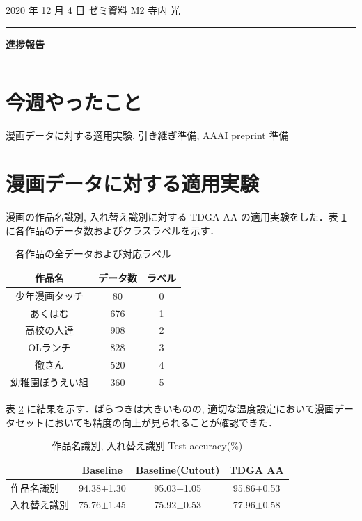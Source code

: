 \documentclass[onecolumn]{ujarticle}   %
\begin{document}
	\noindent

	\hspace{1em}
	2020 年 12 月 4 日
	ゼミ資料
	\hfill
	M2 寺内 光

	\vspace{2mm}

	\hrule

	\begin{center}
		{\Large \bf 進捗報告}
	\end{center}

	\hrule
	\vspace{3mm}

	\section{今週やったこと}
	漫画データに対する適用実験, 引き継ぎ準備, AAAI preprint 準備

  \section{漫画データに対する適用実験}
  漫画の作品名識別, 入れ替え識別に対する TDGA AA の適用実験をした．表 \ref{tab:num_data} に各作品のデータ数およびクラスラベルを示す．

  \begin{table}[h]
  	\centering
  	\caption{各作品の全データおよび対応ラベル}
  	\label{tab:num_data}
  	\begin{tabular}{|c||c|c|} \hline
      作品名&データ数&ラベル \\ \hline
      少年漫画タッチ&80&0\\ \hline
      あくはむ&676&1\\ \hline
      高校の人達&908&2\\ \hline
      OLランチ&828&3\\ \hline
      徹さん&520&4\\ \hline
      幼稚園ぼうえい組&360&5\\ \hline
  	\end{tabular}
  \end{table}

  表 \ref{tab:result_experiments} に結果を示す．ばらつきは大きいものの, 適切な温度設定において漫画データセットにおいても精度の向上が見られることが確認できた．

  \begin{table}[h]
		\centering
		\caption{作品名識別, 入れ替え識別 Test accuracy(\%)}
		\label{tab:result_experiments}
		\begin{tabular}{l||c c c} \hline
		  &Baseline&Baseline(Cutout)&TDGA AA\\ \hline
      作品名識別&94.38$\pm$1.30 &95.03$\pm$1.05&95.86$\pm$0.53\\
      入れ替え識別&75.76$\pm$1.45 &75.92$\pm$0.53&77.96$\pm$0.58\\
		\end{tabular}
	\end{table}
\end{document}
